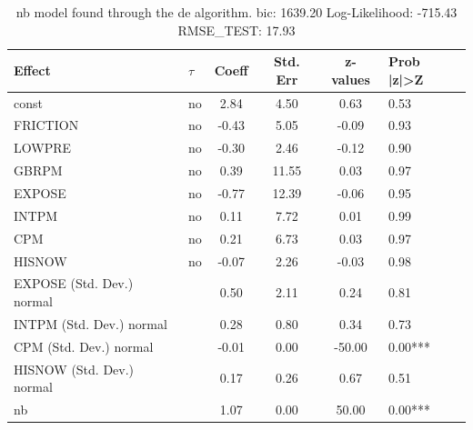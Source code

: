 \begin{table}
	\caption{nb model found through the de algorithm. bic: 1639.20 Log-Likelihood: -715.43 RMSE_TEST: 17.93}
	\begin{center}
		\begin{tabular}{|l|l|c|c|c|l|}
			\hline
			Effect & $\tau$ & Coeff & Std. Err & z-values & Prob |z|>Z \\
			\hline
			const & no & 2.84 & 4.50 & 0.63 & 0.53 \\
			\hline
			FRICTION & no & -0.43 & 5.05 & -0.09 & 0.93 \\
			\hline
			LOWPRE & no & -0.30 & 2.46 & -0.12 & 0.90 \\
			\hline
			GBRPM & no & 0.39 & 11.55 & 0.03 & 0.97 \\
			\hline
			EXPOSE & no & -0.77 & 12.39 & -0.06 & 0.95 \\
			\hline
			INTPM & no & 0.11 & 7.72 & 0.01 & 0.99 \\
			\hline
			CPM & no & 0.21 & 6.73 & 0.03 & 0.97 \\
			\hline
			HISNOW & no & -0.07 & 2.26 & -0.03 & 0.98 \\
			\hline
			EXPOSE (Std. Dev.) normal &  & 0.50 & 2.11 & 0.24 & 0.81 \\
			\hline
			INTPM (Std. Dev.) normal &  & 0.28 & 0.80 & 0.34 & 0.73 \\
			\hline
			CPM (Std. Dev.) normal &  & -0.01 & 0.00 & -50.00 & 0.00*** \\
			\hline
			HISNOW (Std. Dev.) normal &  & 0.17 & 0.26 & 0.67 & 0.51 \\
			\hline
			nb &  & 1.07 & 0.00 & 50.00 & 0.00*** \\
			\hline
		\end{tabular}
	\end{center}
\end{table}